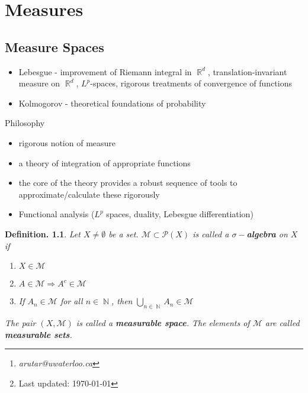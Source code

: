 \documentclass[12pt, a4paper]{memoir}
\title{\subject}
\author{Alex Rutar\thanks{\itshape arutar@uwaterloo.ca}\\ University of Waterloo}
\date{\semester\thanks{Last updated: \today}}
\DeclareMathOperator{\N}{{\mathbb{N}}}
\DeclareMathOperator{\R}{{\mathbb{R}}}
\theoremstyle{nonumberplain}
\newtheorem{definition}{Definition.}
\begin{document}
\hypersetup{pageanchor=false}
\maketitle
\newpage
\frontmatter
\hypersetup{pageanchor=true}
\tableofcontents*
\mainmatter

\chapter{Measures}
\section{Measure Spaces}
\begin{itemize}
    \item Lebesgue - improvement of Riemann integral in $\R^d$, translation-invariant measure on $\R^d$, $L^p$-spaces, rigorous treatments of convergence of functions
    \item Kolmogorov - theoretical foundations of probability
\end{itemize}
Philosophy
\begin{itemize}
    \item rigorous notion of measure
    \item a theory of integration of appropriate functions
    \item the core of the theory provides a robust sequence of tools to approximate/calculate these rigorously
    \item Functional analysis ($L^p$ spaces, duality, Lebesgue differentiation)
\end{itemize}
\begin{definition}
    Let $X\neq\emptyset$ be a set.
    $\mathcal{M}\subset\mathcal{P}(X)$ is called a \textbf{$\sigma-$algebra} on $X$ if
    \begin{enumerate}[nolistsep]
        \item $X\in \mathcal{M}$
        \item $A\in\mathcal{M}\Rightarrow A^c\in\mathcal{M}$
        \item If $A_n\in\mathcal{M}$ for all $n\in\N$, then $\bigcup\limits_{n\in\N}A_n\in\mathcal{M}$
    \end{enumerate}
    The pair $(X,\mathcal{M})$ is called a \textbf{measurable space}.
    The elements of $\mathcal{M}$ are called \textbf{measurable sets}.
\end{definition}
\end{document}
